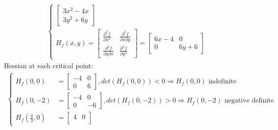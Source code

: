 \documentclass[conference,onecolumn]{IEEEtran}
\begin{document}
\begin{enumerate}
\begin{enumerate}
\begin{align*}
\begin{cases}
\begin{bmatrix}
                                          3x^2 - 4x \\
                                          3y^2 + 6y
                                    \end{bmatrix} \\
                                    H_f(x, y) = \begin{bmatrix}
                                          \frac{\partial^2 f}{\partial x^2}          & \frac{\partial^2 f}{\partial x \partial y} \\
                                          \frac{\partial^2 f}{\partial y \partial x} & \frac{\partial^2 f}{\partial y^2}
                                    \end{bmatrix} = \begin{bmatrix}
                                          6x - 4 & 0      \\
                                          0      & 6y + 6
                                    \end{bmatrix}
                              \end{cases}
                        \end{align*}
                        Hessian at each critical point:
                        \begin{align*}
                              \begin{cases}
                                    H_f(0, 0)            & = \begin{bmatrix}
                                          -4 & 0 \\
                                          0  & 6
                                    \end{bmatrix}, det(H_f(0, 0)) < 0 \Rightarrow H_f(0, 0) \text{ indefinite}                              \\
                                    H_f(0, -2)           & = \begin{bmatrix}
                                          -4 & 0  \\
                                          0  & -6
                                    \end{bmatrix}, det(H_f(0, -2)) > 0 \Rightarrow H_f(0, -2) \text{ negative definite}                     \\
                                    H_f(\frac{4}{3}, 0)  & = \begin{bmatrix}
                                          4 & 0 \\

\end{bmatrix}
\end{cases}
\end{align*}
\end{enumerate}
\end{enumerate}
\end{document}
